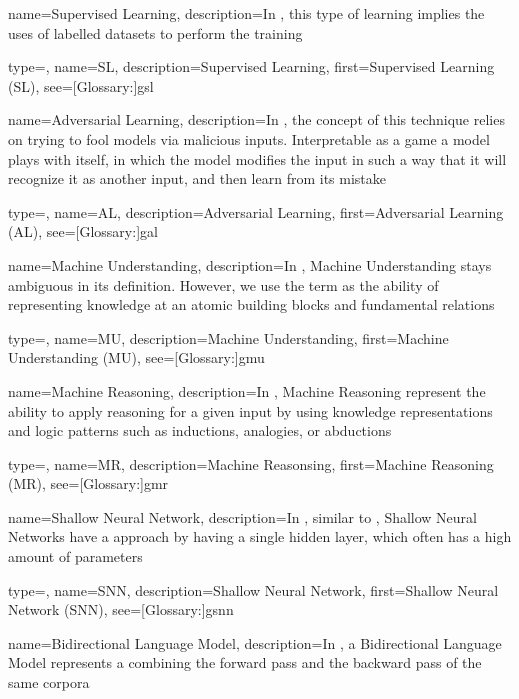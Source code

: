 {
  name={Supervised Learning},
  description={In , this type of learning implies the uses of labelled datasets to perform the training}
}

{
  type=\acronymtype,
  name={SL},
  description={Supervised Learning},
  first={Supervised Learning (SL)},
  see=[Glossary:]{gsl}
}

{
  name={Adversarial Learning},
  description={In , the concept of this technique relies on trying to fool models via malicious inputs. Interpretable as a game a model plays with itself, in which the model modifies the input in such a way that it will recognize it as another input, and then learn from its mistake}
}

{
  type=\acronymtype,
  name={AL},
  description={Adversarial Learning},
  first={Adversarial Learning (AL)},
  see=[Glossary:]{gal}
}

{
  name={Machine Understanding},
  description={In , Machine Understanding stays ambiguous in its definition. However, we use the term as the ability of representing knowledge at an atomic building blocks and fundamental relations}
}

{
  type=\acronymtype,
  name={MU},
  description={Machine Understanding},
  first={Machine Understanding (MU)},
  see=[Glossary:]{gmu}
}

{
  name={Machine Reasoning},
  description={In , Machine Reasoning represent the ability to apply reasoning for a given input by using knowledge representations and logic patterns such as inductions, analogies, or abductions}
}

{
  type=\acronymtype,
  name={MR},
  description={Machine Reasonsing},
  first={Machine Reasoning (MR)},
  see=[Glossary:]{gmr}
}


{
  name={Shallow Neural Network},
  description={In , similar to , Shallow Neural Networks have a  approach by having a single hidden layer, which often has a high amount of parameters}
}

{
  type=\acronymtype,
  name={SNN},
  description={Shallow Neural Network},
  first={Shallow Neural Network (SNN)},
  see=[Glossary:]{gsnn}
}


{
  name={Bidirectional Language Model},
  description={In , a Bidirectional Language Model represents a  combining the forward pass and the backward pass of the same corpora}
}

